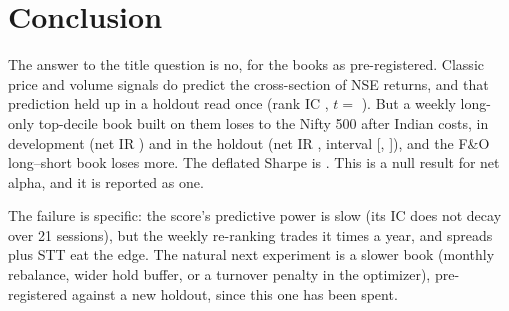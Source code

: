 \section{Conclusion}
The answer to the title question is no, for the books as pre-registered. Classic price and volume signals do predict the cross-section of NSE
returns, and that prediction held up in a holdout read once (rank IC , $t=$ ). But a weekly
long-only top-decile book built on them loses to the Nifty 500 after Indian costs, in development (net IR ) and in the holdout
(net IR , interval [, ]), and the F\&O long--short book loses more. The deflated
Sharpe is . This is a null result for net alpha, and it is reported as one.

The failure is specific: the score's predictive power is slow (its IC does not decay over 21 sessions), but the weekly re-ranking trades it
 times a year, and spreads plus STT eat the edge. The natural next experiment is a slower book (monthly rebalance,
wider hold buffer, or a turnover penalty in the optimizer), pre-registered against a new holdout, since this one has been spent.

